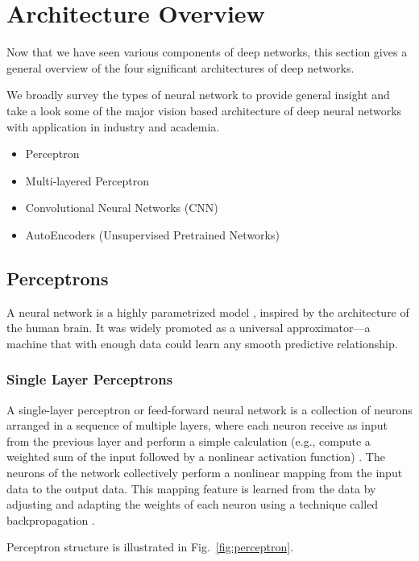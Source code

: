 \section{Architecture Overview}

Now that we have seen various components of deep networks, this section gives a general overview of the four significant architectures of deep networks.

We broadly survey the types of neural network to provide general insight and take a look some of the major vision based architecture of deep neural networks with application in industry and academia. 

\begin{itemize}
\item Perceptron
\item  Multi-layered Perceptron
\item Convolutional Neural Networks (CNN)
\item AutoEncoders (Unsupervised Pretrained Networks)
\end{itemize}


\subsection{Perceptrons}

A neural network is a highly parametrized model \cite{efron2016computer}, inspired by the architecture of the human brain. It was widely promoted as a universal approximator—a machine that with enough data could learn any smooth predictive relationship.

\subsubsection*{Single Layer Perceptrons}

A single-layer perceptron or feed-forward neural network is a collection of neurons arranged in a sequence of multiple layers, where each neuron receive as input from the previous layer and perform a simple calculation (e.g., compute a weighted sum of the input followed by a nonlinear activation function) \cite{efron2016computer}. The neurons of the network collectively perform a nonlinear mapping from the input data to the output data. This mapping feature is learned from the data by adjusting and adapting the weights of each neuron using a technique called backpropagation \cite{efron2016computer}.

Perceptron structure is illustrated in Fig.~\ref{fig:perceptron}.

